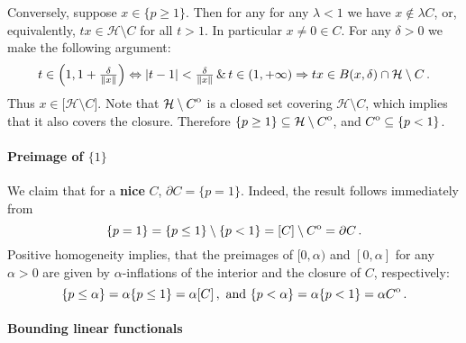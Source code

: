 \documentclass[a4paper]{article}
\newcommand{\Hcal}{\mathcal{H}}
\newcommand{\interior}[1]{%
  {\kern0pt#1}^{\mathrm{o}}%
}
\begin{document}
Conversely, suppose $x\in \{p \geq 1\}$. Then for any for any $\lambda < 1$ we have
$x \notin \lambda C$, or, equivalently, $t x \in \Hcal \setminus C$ for all $t > 1$.
In particular $x\neq 0\in C$. For any $\delta > 0$ we make the following argument:
\begin{equation*}
  t \in\Bigl(1, 1 + \tfrac\delta{\|x\|} \Bigr)
    \Leftrightarrow
      \lvert t - 1\rvert < \tfrac\delta{\|x\|}
      \, \& \, t \in (1, +\infty)
    \Rightarrow
      t x \in B(x, \delta) \cap \Hcal \setminus C
      \,.
\end{equation*}
Thus $x\in \bigl[\Hcal \setminus C \bigr]$. Note that $\Hcal\setminus \interior{C}$
is a closed set covering $\Hcal \setminus C$, which implies that it also covers the
closure. Therefore $\{p \geq 1\} \subseteq \Hcal\setminus \interior{C}$, and $\interior{C}
\subseteq \{p < 1\}$.


\paragraph{Preimage of $\{1\}$} %
\label{par:preimage_of_1}

We claim that for a {\bf nice} $C$, $\partial C = \{p = 1\}$. Indeed, the result
follows immediately from
\begin{equation}
  \{p = 1\}
    = \{p \leq 1\} \setminus \{p < 1\}
    = [C] \setminus \interior{C}
    = \partial C
    \,.
\end{equation}
Positive homogeneity implies, that the preimages of $[0, \alpha)$ and $[0, \alpha]$
for any $\alpha > 0$ are given by $\alpha$-inflations of the interior and the closure
of $C$, respectively:
\begin{equation*}
  \{p \leq \alpha \}
    = \alpha \{p \leq 1\}
    = \alpha [C]
    \,, \text{ and }
  \{p < \alpha \}
    = \alpha \{p < 1\}
    = \alpha \interior{C}
    \,.
\end{equation*}


\paragraph{Bounding linear functionals} %
\label{par:bounding_linear_functionals}
\end{document}
